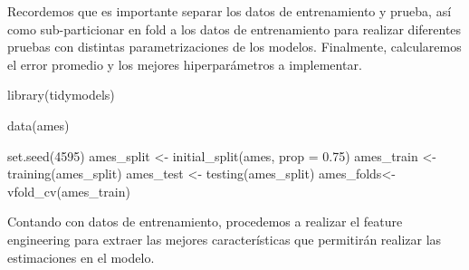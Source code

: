 \documentclass[
]{book}
\newenvironment{Shaded}{\begin{snugshade}}{\end{snugshade}}
\newcommand{\AttributeTok}[1]{\textcolor[rgb]{0.77,0.63,0.00}{#1}}
\newcommand{\DecValTok}[1]{\textcolor[rgb]{0.00,0.00,0.81}{#1}}
\newcommand{\FloatTok}[1]{\textcolor[rgb]{0.00,0.00,0.81}{#1}}
\newcommand{\FunctionTok}[1]{\textcolor[rgb]{0.00,0.00,0.00}{#1}}
\newcommand{\NormalTok}[1]{#1}
\newcommand{\OtherTok}[1]{\textcolor[rgb]{0.56,0.35,0.01}{#1}}
\begin{document}
Recordemos que es importante separar los datos de entrenamiento y prueba, así como sub-particionar en fold a los datos de entrenamiento para realizar diferentes pruebas con distintas parametrizaciones de los modelos. Finalmente, calcularemos el error promedio y los mejores hiperparámetros a implementar.

\begin{Shaded}
\begin{Highlighting}[]
\FunctionTok{library}\NormalTok{(tidymodels)}

\FunctionTok{data}\NormalTok{(ames)}

\FunctionTok{set.seed}\NormalTok{(}\DecValTok{4595}\NormalTok{)}
\NormalTok{ames\_split }\OtherTok{\textless{}{-}} \FunctionTok{initial\_split}\NormalTok{(ames, }\AttributeTok{prop =} \FloatTok{0.75}\NormalTok{)}
\NormalTok{ames\_train }\OtherTok{\textless{}{-}} \FunctionTok{training}\NormalTok{(ames\_split)}
\NormalTok{ames\_test  }\OtherTok{\textless{}{-}} \FunctionTok{testing}\NormalTok{(ames\_split)}
\NormalTok{ames\_folds}\OtherTok{\textless{}{-}} \FunctionTok{vfold\_cv}\NormalTok{(ames\_train)}
\end{Highlighting}
\end{Shaded}

Contando con datos de entrenamiento, procedemos a realizar el feature engineering para extraer las mejores características que permitirán realizar las estimaciones en el modelo.
\end{document}
